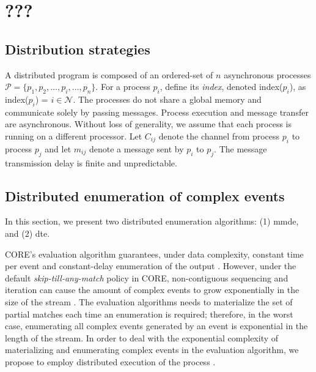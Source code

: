 \chapter{???}\label{chapter:???}


\section{Distribution strategies}\label{sec:distribution_strategies}

A distributed program is composed of an ordered-set of $n$ asynchronous processes $\mathcal{P} = \{ p_{1}, p_{2}, \ldots, p_{i}, \ldots, p_{n}\}$. For a process $p_{i}$, define its \emph{index}, denoted index($p_{i}$), as index($p_{i}$) = $i \in \mathcal{N}$. The processes do not share a global memory and communicate solely by passing messages. Process execution and message transfer are asynchronous. Without loss of generality, we assume that each process is running on a different processor. Let $C_{ij}$ denote the channel from process $p_{i}$ to process $p_{j}$ and let $m_{ij}$ denote a message sent by $p_{i}$ to $p_{j}$. The message transmission delay is finite and unpredictable.


\section{Distributed enumeration of complex events}
\label{sec:distributed_enumeration_of_the_complex_events}

In this section, we present two distributed enumeration algorithms: (1) \acrfull{mmde}, and (2) \acrfull{dte}.

CORE's evaluation algorithm guarantees, under data complexity, constant time per event and constant-delay enumeration of the output \cite{core}. However, under the default \emph{skip-till-any-match} \cite{skip-till-any-match} policy in CORE, non-contiguous sequencing and iteration can cause the amount of complex events to grow exponentially in the size of the stream \cite{formal-framework-cer}. The evaluation algorithms needs to materialize the set of partial matches each time an enumeration is required; therefore, in the worst case, enumerating all complex events generated by an event is exponential in the length of the stream. In order to deal with the exponential complexity of materializing and enumerating complex events in the evaluation algorithm, we propose to employ distributed execution of the process \cite{distributed-computing-book}.

